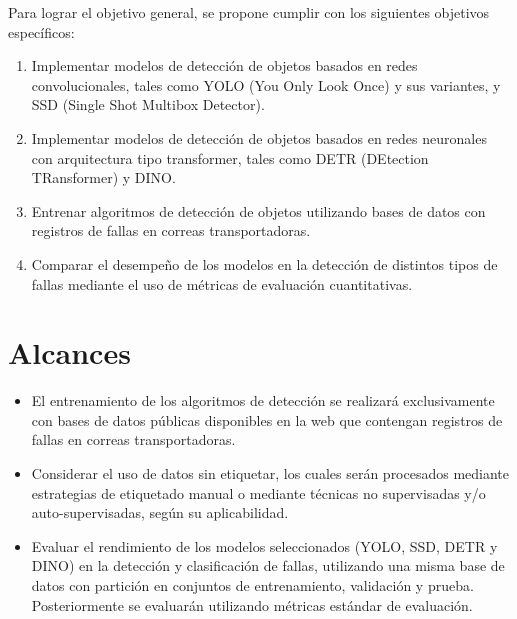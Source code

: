 Para lograr el objetivo general, se propone cumplir con los siguientes objetivos específicos:

\begin{enumerate}
    \item Implementar modelos de detección de objetos basados en redes convolucionales, tales como YOLO (You Only Look Once) y sus variantes, y SSD (Single Shot Multibox Detector).

    \item Implementar modelos de detección de objetos basados en redes neuronales con arquitectura tipo transformer, tales como DETR (DEtection TRansformer) y DINO.

    \item Entrenar algoritmos de detección de objetos utilizando bases de datos con registros de fallas en correas transportadoras.

    \item Comparar el desempeño de los modelos en la detección de distintos tipos de fallas mediante el uso de métricas de evaluación cuantitativas.

    
\end{enumerate}


\section{Alcances}

\begin{itemize}
    \item El entrenamiento de los algoritmos de detección se realizará exclusivamente con bases de datos públicas disponibles en la web que contengan registros de fallas en correas transportadoras.

    \item Considerar el uso de datos sin etiquetar, los cuales serán procesados mediante estrategias de etiquetado manual o mediante técnicas no supervisadas y/o auto-supervisadas, según su aplicabilidad.

    \item Evaluar el rendimiento de los modelos seleccionados (YOLO, SSD, DETR y DINO) en la detección y clasificación de fallas, utilizando una misma base de datos con partición en conjuntos de entrenamiento, validación y prueba. Posteriormente se evaluarán utilizando métricas estándar de evaluación.
    
\end{itemize}